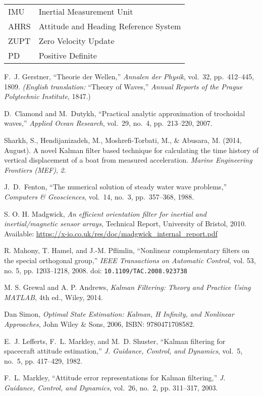 \documentclass[11pt,letterpaper]{article}
\begin{document}
\begin{tabular}{ll}
IMU & Inertial Measurement Unit \\
AHRS & Attitude and Heading Reference System \\
ZUPT & Zero Velocity Update \\
PD & Positive Definite \\
\end{tabular}

\begin{thebibliography}{20}

F.~J. Gerstner, ``Theorie der Wellen,'' 
\emph{Annalen der Physik}, vol.~32, pp.~412–445, 1809.  
\emph{(English translation: }``Theory of Waves,'' \emph{Annual Reports of the Prague Polytechnic Institute}, 1847.)

D.~Clamond and M.~Dutykh, ``Practical analytic approximation of trochoidal waves,'' 
\emph{Applied Ocean Research}, vol.~29, no.~4, pp.~213–220, 2007.

Sharkh, S., Hendijanizadeh, M., Moshrefi-Torbati, M., \& Abusara, M. (2014, August). 
A novel Kalman filter based technique for calculating the time history of vertical displacement of a boat from measured acceleration. 
\textit{Marine Engineering Frontiers (MEF)}, \textit{2}.

J.~D.~Fenton, “The numerical solution of steady water wave problems,” \emph{Computers \& Geosciences}, vol.~14, no.~3, pp.~357–368, 1988.

S. O. H. Madgwick,  
\textit{An efficient orientation filter for inertial and inertial/magnetic sensor arrays},  
Technical Report, University of Bristol, 2010.  
Available: \url{https://x-io.co.uk/res/doc/madgwick_internal_report.pdf}

R. Mahony, T. Hamel, and J.-M. Pflimlin,  
``Nonlinear complementary filters on the special orthogonal group,''  
\textit{IEEE Transactions on Automatic Control}, vol. 53, no. 5, pp. 1203--1218, 2008.  
doi: \texttt{10.1109/TAC.2008.923738}

M. S. Grewal and A. P. Andrews,  
\textit{Kalman Filtering: Theory and Practice Using MATLAB},  
4th ed., Wiley, 2014.

Dan Simon,
\textit{Optimal State Estimation: Kalman, H Infinity, and Nonlinear Approaches},
John Wiley \& Sons, 2006,
ISBN: 9780471708582.

E.~J. Lefferts, F.~L. Markley, and M.~D. Shuster, “Kalman filtering for spacecraft attitude estimation,” \emph{J. Guidance, Control, and Dynamics}, vol.~5, no.~5, pp. 417–429, 1982.

F.~L. Markley, “Attitude error representations for Kalman filtering,” \emph{J. Guidance, Control, and Dynamics}, vol.~26, no.~2, pp. 311–317, 2003.

\end{thebibliography}
\end{document}
